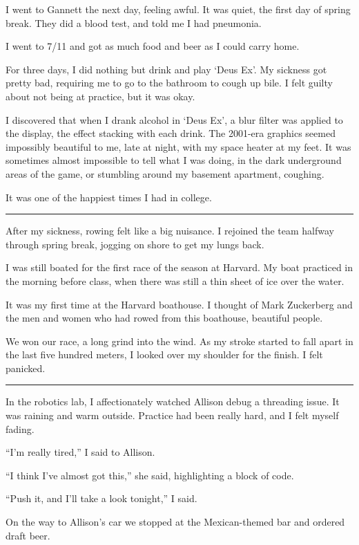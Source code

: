 I went to Gannett the next day, feeling awful.  It was quiet, the first day of
spring break.  They did a blood test, and told me I had pneumonia.

I went to 7/11 and got as much food and beer as I could carry home.

For three days, I did nothing but drink and play `Deus Ex'.  My sickness got
pretty bad, requiring me to go to the bathroom to cough up bile.  I felt guilty
about not being at practice, but it was okay.   

I discovered that when I drank alcohol in `Deus Ex', a blur filter was applied
to the display, the effect stacking with each drink.  The 2001-era graphics
seemed impossibly beautiful to me, late at night, with my space heater at my
feet.  It was sometimes almost impossible to tell what I was doing, in the dark
underground areas of the game, or stumbling around my basement apartment,
coughing.

It was one of the happiest times I had in college.

\plainfancybreak{12pt}{2}{}

After my sickness, rowing felt like a big nuisance.  I rejoined the team halfway
through spring break, jogging on shore to get my lungs back.  

I was still boated for the first race of the season at Harvard.  My boat
practiced in the morning before class, when there was still a thin sheet of ice
over the water.

It was my first time at the Harvard boathouse.  I thought of Mark Zuckerberg and
the men and women who had rowed from this boathouse, beautiful people. 

We won our race, a long grind into the wind.  As my stroke started to fall apart
in the last five hundred meters, I looked over my shoulder for the finish.  I felt
panicked.

\plainfancybreak{12pt}{2}{}

In the robotics lab, I affectionately watched Allison debug a threading issue.
It was raining and warm outside.  Practice had been really hard, and I felt
myself fading.

``I'm really tired,'' I said to Allison.

``I think I've almost got this,'' she said, highlighting a block of code.

``Push it, and I'll take a look tonight,'' I said.

On the way to Allison's car we stopped at the Mexican-themed bar and ordered
draft beer.

